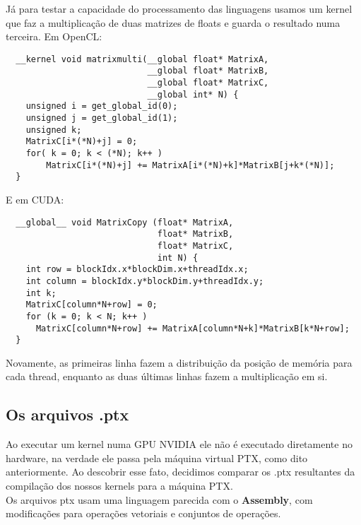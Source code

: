 Já para testar a capacidade do processamento das linguagens usamos um kernel que faz a multiplicação de duas matrizes de floats e guarda
o resultado numa terceira.
Em OpenCL:
\begin{lstlisting}
  __kernel void matrixmulti(__global float* MatrixA, 
                            __global float* MatrixB, 
                            __global float* MatrixC, 
                            __global int* N) {
    unsigned i = get_global_id(0);
    unsigned j = get_global_id(1);
    unsigned k;
    MatrixC[i*(*N)+j] = 0;
    for( k = 0; k < (*N); k++ ) 
    	MatrixC[i*(*N)+j] += MatrixA[i*(*N)+k]*MatrixB[j+k*(*N)];
  }
\end{lstlisting}
E em CUDA:
\begin{lstlisting}
  __global__ void MatrixCopy (float* MatrixA, 
                              float* MatrixB, 
                              float* MatrixC, 
                              int N) {
    int row = blockIdx.x*blockDim.x+threadIdx.x;
    int column = blockIdx.y*blockDim.y+threadIdx.y;
    int k;
    MatrixC[column*N+row] = 0;
    for (k = 0; k < N; k++ )
      MatrixC[column*N+row] += MatrixA[column*N+k]*MatrixB[k*N+row];
  }
\end{lstlisting}

Novamente, as primeiras linha fazem a distribuição da posição de memória para cada thread, enquanto as duas últimas linhas fazem a multiplicação em si. \\

\subsection{Os arquivos .ptx}

Ao executar um kernel numa GPU NVIDIA ele não é executado diretamente no hardware, na verdade ele passa pela máquina virtual PTX, como dito anteriormente.
Ao descobrir esse fato, decidimos comparar os .ptx resultantes da compilação dos nossos kernels para a máquina PTX.  \\
Os arquivos ptx usam uma linguagem parecida com o \textbf{Assembly}, com modificações para operações vetoriais e conjuntos de operações.
